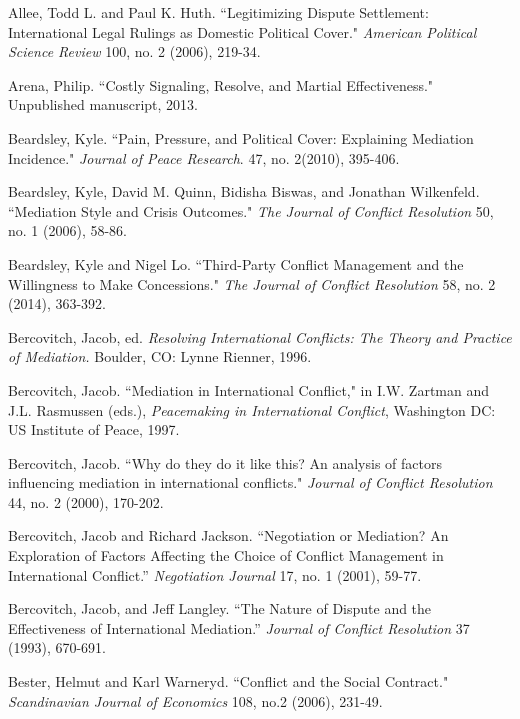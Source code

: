 \documentclass[12pt, letterpaper]{article}
\begin{document}
{\begin{list}{}{\setlength{\leftmargin}{0.0in}\setlength{\rightmargin}{0.0in}\setlength{\itemindent}{0.0in}\setlength{\itemsep}{0.05in}}
\item Allee, Todd L. and Paul K. Huth. ``Legitimizing Dispute Settlement: International Legal Rulings as Domestic Political Cover." \emph{American Political Science Review} 100, no. 2 (2006), 219-34. 

\item Arena, Philip. ``Costly Signaling, Resolve, and Martial Effectiveness." Unpublished manuscript, 2013. 

\item Beardsley, Kyle. ``Pain, Pressure, and Political Cover: Explaining Mediation Incidence." \emph{Journal of Peace Research}. 47, no. 2(2010), 395-406. 

\item Beardsley, Kyle, David M. Quinn, Bidisha Biswas, and Jonathan Wilkenfeld. ``Mediation Style and Crisis Outcomes." \emph{The Journal of Conflict Resolution} 50, no. 1 (2006),  58-86. 

\item Beardsley, Kyle and Nigel Lo. ``Third-Party Conflict Management and the Willingness to Make Concessions." \emph{The Journal of Conflict Resolution} 58, no. 2 (2014), 363-392. 

\item Bercovitch, Jacob, ed. \emph{Resolving International Conflicts: The Theory and Practice of Mediation.} Boulder, CO: Lynne Rienner,  1996.

\item Bercovitch, Jacob. ``Mediation in International Conflict," in I.W. Zartman and J.L. Rasmussen (eds.), \emph{Peacemaking in International Conflict}, Washington DC: US Institute of Peace, 1997. 
 
\item Bercovitch, Jacob. ``Why do they do it like this? An analysis of factors influencing mediation in international conflicts." \emph{Journal of Conflict Resolution} 44, no. 2 (2000), 170-202.
  
\item Bercovitch, Jacob and Richard Jackson. ``Negotiation or Mediation? An Exploration of Factors Affecting the Choice of Conflict Management in International Conflict.'' \emph{Negotiation Journal} 17, no. 1 (2001), 59-77.
 
\item Bercovitch, Jacob, and Jeff Langley. ``The Nature of Dispute and the Effectiveness of International Mediation.'' \emph{Journal of Conflict Resolution} 37 (1993), 670-691.

\item Bester, Helmut and Karl Warneryd. ``Conflict and the Social Contract." \emph{ Scandinavian Journal of Economics} 108, no.2 (2006), 231-49.


\end{list}}
\end{document}
